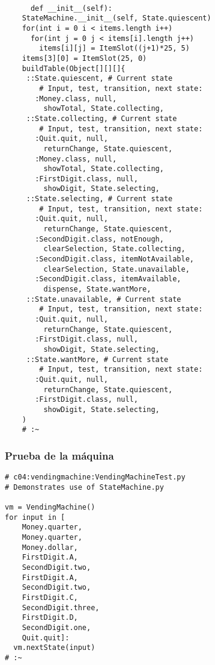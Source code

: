 \begin{lstlisting}
    
      def __init__(self): 
    StateMachine.__init__(self, State.quiescent) 
    for(int i = 0 i < items.length i++) 
      for(int j = 0 j < items[i].length j++) 
        items[i][j] = ItemSlot((j+1)*25, 5) 
    items[3][0] = ItemSlot(25, 0) 
    buildTable(Object[][][]{ 
     ::State.quiescent, # Current state 
        # Input, test, transition, next state: 
       :Money.class, null,  
         showTotal, State.collecting, 
     ::State.collecting, # Current state 
        # Input, test, transition, next state: 
       :Quit.quit, null,  
         returnChange, State.quiescent, 
       :Money.class, null,  
         showTotal, State.collecting, 
       :FirstDigit.class, null,  
         showDigit, State.selecting, 
     ::State.selecting, # Current state 
        # Input, test, transition, next state: 
       :Quit.quit, null,  
         returnChange, State.quiescent, 
       :SecondDigit.class, notEnough,  
         clearSelection, State.collecting, 
       :SecondDigit.class, itemNotAvailable,  
         clearSelection, State.unavailable, 
       :SecondDigit.class, itemAvailable,  
         dispense, State.wantMore, 
     ::State.unavailable, # Current state 
        # Input, test, transition, next state: 
       :Quit.quit, null,  
         returnChange, State.quiescent, 
       :FirstDigit.class, null,  
         showDigit, State.selecting, 
     ::State.wantMore, # Current state 
        # Input, test, transition, next state: 
       :Quit.quit, null,  
         returnChange, State.quiescent, 
       :FirstDigit.class, null,  
         showDigit, State.selecting, 
    ) 
    # :~ 
\end{lstlisting}

\subsubsection*{Prueba de la máquina}
\label{subsubsec:pdlm}


\begin{lstlisting} 
# c04:vendingmachine:VendingMachineTest.py 
# Demonstrates use of StateMachine.py 

vm = VendingMachine() 
for input in [   
    Money.quarter, 
    Money.quarter, 
    Money.dollar, 
    FirstDigit.A, 
    SecondDigit.two, 
    FirstDigit.A, 
    SecondDigit.two, 
    FirstDigit.C, 
    SecondDigit.three, 
    FirstDigit.D, 
    SecondDigit.one, 
    Quit.quit]: 
  vm.nextState(input) 
# :~ 
\end{lstlisting}


